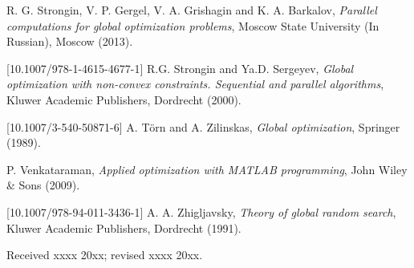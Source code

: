 \documentclass{aims}
\theoremstyle{definition}
\begin{document}
\begin{thebibliography}{10}
\newblock R. G. Strongin, V. P. Gergel, V. A. Grishagin and K. A. Barkalov,
\newblock \emph{Parallel computations for global optimization problems},
\newblock Moscow State University (In Russian), Moscow (2013).

[10.1007/978-1-4615-4677-1]
\newblock R.G. Strongin and Ya.D. Sergeyev,
\newblock \emph{Global optimization with non-convex constraints. Sequential and parallel algorithms},
\newblock Kluwer Academic Publishers, Dordrecht (2000).

[10.1007/3-540-50871-6]
\newblock A. Törn and A. Zilinskas,
\newblock \emph{Global optimization},
\newblock Springer (1989).

\newblock P. Venkataraman,
\newblock \emph{Applied optimization with MATLAB programming},
\newblock John Wiley \& Sons (2009).

[10.1007/978-94-011-3436-1]
\newblock A. A. Zhigljavsky,
\newblock \emph{Theory of global random search},
\newblock Kluwer Academic Publishers, Dordrecht (1991).

\end{thebibliography}

\medskip
Received xxxx 20xx; revised xxxx 20xx.
\medskip
\end{document}
